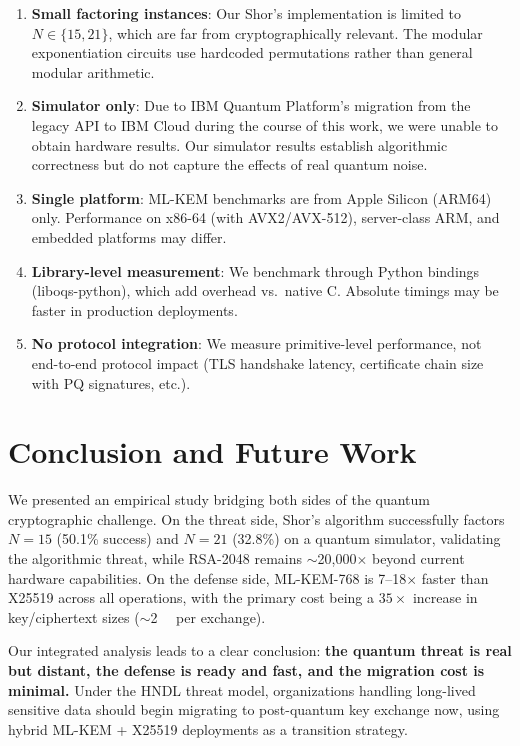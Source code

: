 \documentclass[conference]{IEEEtran}
\begin{document}
\begin{enumerate}[leftmargin=*]
    \item \textbf{Small factoring instances}: Our Shor's implementation is limited to $N \in \{15, 21\}$, which are far from cryptographically relevant. The modular exponentiation circuits use hardcoded permutations rather than general modular arithmetic.
    \item \textbf{Simulator only}: Due to IBM Quantum Platform's migration from the legacy API to IBM Cloud during the course of this work, we were unable to obtain hardware results. Our simulator results establish algorithmic correctness but do not capture the effects of real quantum noise.
    \item \textbf{Single platform}: ML-KEM benchmarks are from Apple Silicon (ARM64) only. Performance on x86-64 (with AVX2/AVX-512), server-class ARM, and embedded platforms may differ.
    \item \textbf{Library-level measurement}: We benchmark through Python bindings (liboqs-python), which add overhead vs.\ native C. Absolute timings may be faster in production deployments.
    \item \textbf{No protocol integration}: We measure primitive-level performance, not end-to-end protocol impact (TLS handshake latency, certificate chain size with PQ signatures, etc.).
\end{enumerate}

\section{Conclusion and Future Work}
\label{sec:conclusion}

We presented an empirical study bridging both sides of the quantum cryptographic challenge. On the threat side, Shor's algorithm successfully factors $N=15$ (50.1\% success) and $N=21$ (32.8\%) on a quantum simulator, validating the algorithmic threat, while RSA-2048 remains $\sim$20,000$\times$ beyond current hardware capabilities. On the defense side, ML-KEM-768 is 7--18$\times$ faster than X25519 across all operations, with the primary cost being a $35\times$ increase in key/ciphertext sizes ($\sim$\SI{2}{\kilo\byte} per exchange).

Our integrated analysis leads to a clear conclusion: \textbf{the quantum threat is real but distant, the defense is ready and fast, and the migration cost is minimal.} Under the HNDL threat model, organizations handling long-lived sensitive data should begin migrating to post-quantum key exchange now, using hybrid ML-KEM + X25519 deployments as a transition strategy.
\end{document}
